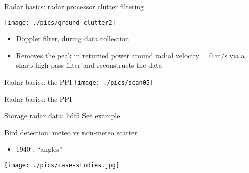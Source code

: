 \documentclass[usenames,dvipsnames]{beamer}
\begin{document}
\begin{frame}{Radar basics: radar processor clutter filtering}
	\begin{center}
		\texttt{[image: ./pics/ground-clutter2]}
	\end{center}

	\begin{itemize}				
		\item Doppler filter, during data collection
		\item Removes the peak in returned power around radial velocity = 0 m/s via a sharp high-pass filter and reconstructs the data
	\end{itemize}
\end{frame}


\begin{frame}{Radar basics: the PPI}
\centering
\texttt{[image: ./pics/scan05]}
\end{frame}

\begin{frame}{Radar basics: the PPI}
\centering
{}
\end{frame}


\begin{frame}{Storage radar data: hdf5}
See example
\end{frame}


\begin{frame}{Bird detection: meteo vs non-meteo scatter}
\begin{itemize}
	\item 1940$^s$, ``angles''
\end{itemize}
\begin{center}
		\texttt{[image: ./pics/case-studies.jpg]}
\end{center}
\end{frame}
\end{document}
